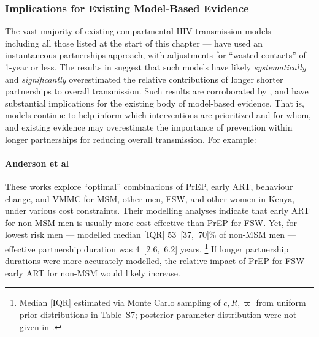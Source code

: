 \subsubsection{Implications for Existing Model-Based Evidence}\label{foi.disc.bip.evid}
The vast majority of existing compartmental HIV transmission models
--- including all those listed at the start of this chapter ---
have used an instantaneous partnerships approach,
with adjustments for ``wasted contacts'' of 1-year or less.
The results in  suggest that such models
have likely \emph{systematically} and \emph{significantly} overestimated
the relative contributions of longer \vs shorter partnerships to overall transmission.
Such results are corroborated by \cite{Johnson2016a},
and have substantial implications for the existing body of model-based evidence.
That is, models continue to help inform which interventions are prioritized and for whom,
and existing evidence may overestimate the importance of prevention within longer partnerships
for reducing overall transmission. For example:
\paragraph{Anderson et al}\cite{Anderson2014,Anderson2017,Anderson2018}
These works explore ``optimal'' combinations of PrEP, early ART, behaviour change, and VMMC
for MSM, other men, FSW, and other women in Kenya, under various cost constraints.
Their modelling analyses indicate that
early ART for non-MSM men is usually more cost effective than PrEP for FSW.
Yet, for lowest risk men --- modelled median [IQR] 53~[37,~70]\% of non-MSM men ---
effective partnership duration was 4~[2.6,~6.2] years.%
\footnote{Median [IQR] estimated via Monte Carlo sampling of $\bar{c}, R, \varpi$
  from uniform prior distributions in Table~S7;
  posterior parameter distribution were not given in \cite{Anderson2014}.}
If longer partnership durations were more accurately modelled,
the relative impact of PrEP for FSW \vs early ART for non-MSM would likely increase.
